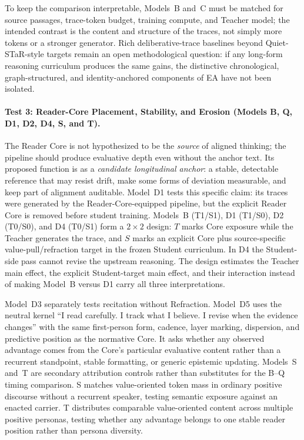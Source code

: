 To keep the
comparison interpretable, Models~B and~C must be matched for source passages,
trace-token budget, training compute, and Teacher model; the intended contrast
is the content and structure of the traces, not simply more tokens or a
stronger generator. Rich deliberative-trace baselines beyond Quiet-STaR-style
targets remain an open methodological question: if any long-form reasoning
curriculum produces the same gains, the distinctive chronological, graph-structured,
and identity-anchored components of EA have not been isolated.

\paragraph{Test 3: Reader-Core Placement, Stability, and Erosion (Models B, Q, D1, D2, D4, S, and T).}
The Reader Core is not hypothesized to be the \emph{source} of aligned
thinking; the pipeline should produce evaluative depth even without the anchor
text. Its proposed function is as a \emph{candidate longitudinal anchor}: a
stable, detectable reference that may resist drift, make some forms of
deviation measurable, and keep part of alignment auditable. Model~D1 tests this
specific claim: its traces were
generated by the Reader-Core-equipped pipeline, but the explicit Reader Core is
removed before student training. Models~B (T1/S1), D1 (T1/S0), D2 (T0/S0),
and D4 (T0/S1) form a $2\times2$ design: $T$ marks Core exposure while the
Teacher generates the trace, and $S$ marks an explicit Core plus
source-specific value-pull/refraction target in the frozen Student curriculum.
In D4 the Student-side pass cannot revise the upstream reasoning. The design
estimates the Teacher main effect, the explicit Student-target main effect, and
their interaction instead of making Model~B versus D1 carry all three
interpretations.

Model~D3 separately tests recitation without Refraction. Model~D5 uses the
neutral kernel ``I read carefully. I track what I believe. I revise when the
evidence changes'' with the same first-person form, cadence, layer marking,
dispersion, and predictive position as the normative Core. It asks whether any
observed advantage comes from the Core's particular evaluative content rather
than a recurrent standpoint, stable formatting, or generic epistemic updating.
Models~S and~T are secondary attribution controls rather than substitutes for
the B--Q timing comparison. S matches value-oriented token mass in ordinary
positive discourse without a recurrent speaker, testing semantic exposure
against an enacted carrier. T distributes comparable value-oriented content
across multiple positive personas, testing whether any advantage belongs to
one stable reader position rather than persona diversity.

